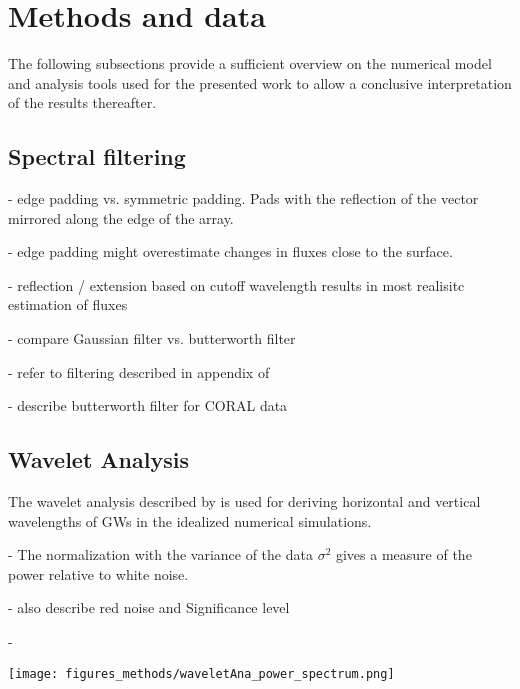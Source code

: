 \chapter{Methods and data}
\label{sec:methods}
The following subsections provide a sufficient overview on the numerical model and analysis tools used for the presented work to allow a conclusive interpretation of the results thereafter.

\section{Spectral filtering}
\label{sec:spectral_filter}


- edge padding vs. symmetric padding. Pads with the reflection of the vector mirrored along the edge of the array.

- edge padding might overestimate changes in fluxes close to the surface.

- reflection / extension based on cutoff wavelength results in most realisitc estimation of fluxes 

- compare Gaussian filter vs. butterworth filter

- refer to filtering described in appendix of \textcite[]{kruse_gravity_2015}

- describe butterworth filter for CORAL data

\section{Wavelet Analysis}
\label{sec:wavelet}
The wavelet analysis described by \textcite{torrence_practical_1998} is used for deriving horizontal and vertical wavelengths of GWs in the idealized numerical simulations. 



- The normalization with the variance of the data $\sigma^2$ gives a measure of the power relative to white noise. 

- also describe red noise and Significance level

- 

\begin{figure*}[t]
    \centering
    \texttt{[image: figures\_methods/waveletAna\_power\_spectrum.png]}
    \caption{}
    \label{fig:wavelet_example}
\end{figure*}


